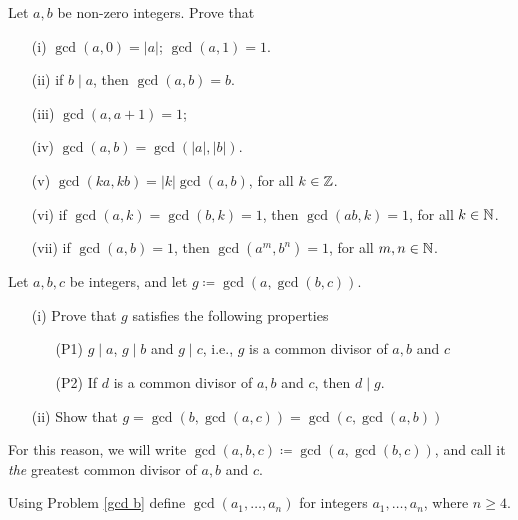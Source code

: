 \vspace*{0.1in}

\begin{problem}\label{gcd a}
Let $a,b$ be non-zero integers. Prove that
\begin{itemize}
\item[(i)] $\gcd(a,0) = |a|$; $\gcd(a,1) = 1$.
\item[(ii)] if $b\mid a$, then $\gcd(a,b) = b$.
\item[(iii)] $\gcd(a,a+1) = 1$; 
\item[(iv)] $\gcd(a,b) = \gcd(|a|,|b|)$.
\item[(v)] $\gcd(ka,kb) = |k|\gcd(a,b)$, for all $k \in \mathbb Z$.
\item[(vi)] if $\gcd(a,k) = \gcd(b,k) = 1$, then $\gcd(ab,k) = 1$, for all $k \in \mathbb N$.
\item[(vii)] if $\gcd(a,b) = 1$, then $\gcd(a^m,b^n) = 1$, for all $m,n \in \mathbb N$.
\end{itemize}
\end{problem}

\vspace*{0.1in}

\begin{problem}\label{gcd b}
Let $a,b,c$ be integers, and let $g\coloneqq \gcd(a,\gcd(b,c))$. 
\begin{itemize}
\item[(i)] Prove that $g$ satisfies the following properties
\begin{itemize}
\item[(P1)] $g\mid a$, $g\mid b$ and $g\mid c$, i.e., $g$ is a common divisor of $a,b$ and $c$
\item[(P2)] If $d$ is a common divisor of $a,b$ and $c$, then $d\mid g$.
\end{itemize}
\item[(ii)] Show that $g = \gcd(b,\gcd(a,c)) = \gcd(c,\gcd(a,b))$
\end{itemize}
For this reason, we will write $\gcd(a, b, c) \coloneqq \gcd(a, \gcd(b, c))$, and call it \emph{the} greatest common divisor of $a, b$ and $c$.
\end{problem}

\vspace*{0.1in}

\begin{problem}\label{gcd c}
Using Problem \ref{gcd b} define $\gcd(a_1,\ldots,a_n)$ for integers $a_1,\ldots,a_n$, where $n \geq 4$.
\end{problem}